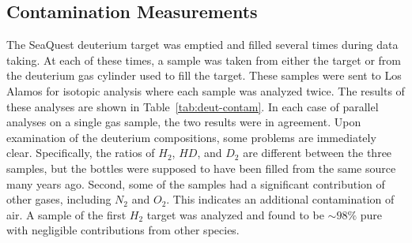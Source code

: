 \subsection{Contamination Measurements}

The SeaQuest deuterium target was emptied and filled several times during data taking. At each of these times, a sample was taken from either the target or from the deuterium gas cylinder used to fill the target. These samples were sent to Los Alamos for isotopic analysis where each sample was analyzed twice. The results of these analyses are shown in Table~\ref{tab:deut-contam}. In each case of parallel analyses on a single gas sample, the two results were in agreement. Upon examination of the deuterium compositions, some problems are immediately clear. Specifically, the ratios of $H_2$, $HD$, and $D_2$ are different between the three samples, but the bottles were supposed to have been filled from the same source many years ago. Second, some of the samples had a significant contribution of other gases, including $N_2$ and $O_2$. This indicates an additional contamination of air. A sample of the first $H_2$ target was analyzed and found to be $\sim98\%$ pure with negligible contributions from other species.

